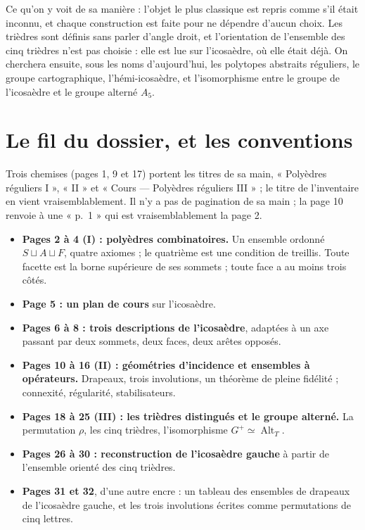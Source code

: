 \documentclass[11pt,a4paper]{article}
\begin{document}
\begin{resume}
Ce qu'on y voit de sa manière : l'objet le plus classique est repris comme s'il
était inconnu, et chaque construction est faite pour ne dépendre d'aucun choix.
Les trièdres sont définis sans parler d'angle droit, et l'orientation de
l'ensemble des cinq trièdres n'est pas choisie : elle est lue sur l'icosaèdre,
où elle était déjà. On cherchera ensuite, sous les noms d'aujourd'hui, les
polytopes abstraits réguliers, le groupe cartographique, l'hémi-icosaèdre, et
l'isomorphisme entre le groupe de l'icosaèdre et le groupe alterné $A_5$.

\end{resume}

\section*{Le fil du dossier, et les conventions}

Trois chemises (pages 1, 9 et 17) portent les titres de sa main,
« Polyèdres réguliers I », « II » et « Cours --- Polyèdres réguliers
III » ; le titre de l'inventaire en vient vraisemblablement. Il n'y a pas de
pagination de sa main ; la page 10 renvoie à une « p.~1 » qui est
vraisemblablement la page 2.

\begin{itemize}
  \item \textbf{Pages 2 à 4 (I) : polyèdres combinatoires.} Un ensemble ordonné
    $S \sqcup A \sqcup F$, quatre axiomes ; le quatrième est une condition de
    treillis. Toute facette est la borne supérieure de ses sommets ; toute face
    a au moins trois côtés.
  \item \textbf{Page 5 : un plan de cours} sur l'icosaèdre.
  \item \textbf{Pages 6 à 8 : trois descriptions de l'icosaèdre}, adaptées à
    un axe passant par deux sommets, deux faces, deux arêtes opposés.
  \item \textbf{Pages 10 à 16 (II) : géométries d'incidence et ensembles à
    opérateurs.} Drapeaux, trois involutions, un théorème de pleine fidélité ;
    connexité, régularité, stabilisateurs.
  \item \textbf{Pages 18 à 25 (III) : les trièdres distingués et le groupe
    alterné.} La permutation $\rho$, les cinq trièdres, l'isomorphisme
    $G^{+} \simeq \operatorname{Alt}_T$.
  \item \textbf{Pages 26 à 30 : reconstruction de l'icosaèdre gauche} à partir
    de l'ensemble orienté des cinq trièdres.
  \item \textbf{Pages 31 et 32}, d'une autre encre : un tableau des ensembles
    de drapeaux de l'icosaèdre gauche, et les trois involutions écrites comme
    permutations de cinq lettres.
\end{itemize}
\end{document}
